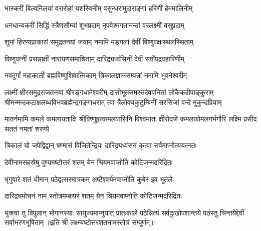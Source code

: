 \twolineshloka
{भास्करीं बिल्वनिलयां वरारोहां यशस्विनीम्}
{वसुन्धरामुदाराङ्गां हरिणीं हेममालिनीम्}

\twolineshloka
{धनधान्यकरीं सिद्धिं स्त्रैणसौम्यां शुभप्रदाम्}
{नृपवेश्मगतानन्दां वरलक्ष्मीं वसुप्रदाम्}

\twolineshloka
{शुभां हिरण्यप्राकारां समुद्रतनयां जयाम्}
{नमामि मङ्गलां देवीं विष्णुवक्षःस्थलस्थिताम्}

\twolineshloka
{विष्णुपत्नीं प्रसन्नाक्षीं नारायणसमाश्रिताम्}
{दारिद्र्यध्वंसिनीं देवीं सर्वोपद्रवहारिणीम्}

\twolineshloka
{नवदुर्गां महाकालीं ब्रह्मविष्णुशिवात्मिकाम्}
{त्रिकालज्ञानसम्पन्नां नमामि भुवनेश्वरीम्}

\fourlineindentedshloka
{लक्ष्मीं क्षीरसमुद्रराजतनयां श्रीरङ्गधामेश्वरीम्}
{दासीभूतसमस्तदेववनितां लोकैकदीपाङ्कुराम्}
{श्रीमन्मन्दकटाक्षलब्धविभवब्रह्मेन्द्रगङ्गाधराम्}
{त्वां त्रैलोक्यकुटुम्बिनीं सरसिजां वन्दे मुकुन्दप्रियाम्}

\fourlineindentedshloka
{मातर्नमामि कमले कमलायताक्षि}
{श्रीविष्णुहृत्कमलवासिनि विश्वमातः}
{क्षीरोदजे कमलकोमलगर्भगौरि}
{लक्ष्मि प्रसीद सततं नमतां शरण्ये}

\twolineshloka
{त्रिकालं यो जपेद्विद्वान् षण्मासं विजितेन्द्रियः}
{दारिद्र्यध्वंसनं कृत्वा सर्वमाप्नोत्ययत्नतः}

\twolineshloka
{देवीनामसहस्रेषु पुण्यमष्टोत्तरं शतम्}
{येन श्रियमवाप्नोति कोटिजन्मदरिद्रितः}

\twolineshloka
{भृगुवारे शतं धीमान् पठेद्वत्सरमात्रकम्}
{अष्टैश्वर्यमवाप्नोति कुबेर इव भूतले}

\twolineshloka
{दारिद्र्यमोचनं नाम स्तोत्रमम्बापरं शतम्}
{येन श्रियमवाप्नोति कोटिजन्मदरिद्रितः}

\threelineshloka
{भुक्त्वा तु विपुलान् भोगानस्याः सायुज्यमाप्नुयात्}
{प्रातःकाले पठेन्नित्यं सर्वदुःखोपशान्तये}
{पठंस्तु चिन्तयेद्देवीं सर्वाभरणभूषिताम्}
॥इति श्री लक्ष्म्यष्टोत्तरशतनामस्तोत्रं सम्पूर्णम्॥